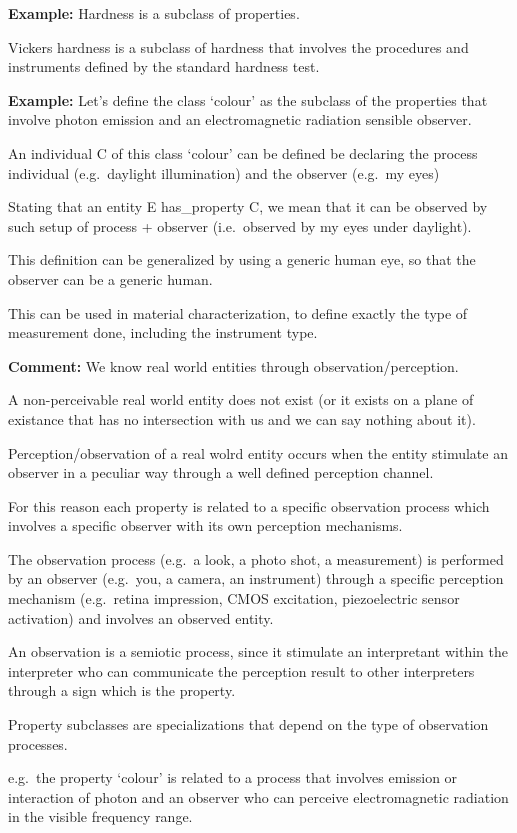 \documentclass[a4paper,]{report}
\begin{document}
\textbf{Example:} Hardness is a subclass of properties.

Vickers hardness is a subclass of hardness that involves the procedures
and instruments defined by the standard hardness test.

\textbf{Example:} Let's define the class `colour' as the subclass of the
properties that involve photon emission and an electromagnetic radiation
sensible observer.

An individual C of this class `colour' can be defined be declaring the
process individual (e.g.~daylight illumination) and the observer
(e.g.~my eyes)

Stating that an entity E has\_property C, we mean that it can be
observed by such setup of process + observer (i.e.~observed by my eyes
under daylight).

This definition can be generalized by using a generic human eye, so that
the observer can be a generic human.

This can be used in material characterization, to define exactly the
type of measurement done, including the instrument type.

\textbf{Comment:} We know real world entities through
observation/perception.

A non-perceivable real world entity does not exist (or it exists on a
plane of existance that has no intersection with us and we can say
nothing about it).

Perception/observation of a real wolrd entity occurs when the entity
stimulate an observer in a peculiar way through a well defined
perception channel.

For this reason each property is related to a specific observation
process which involves a specific observer with its own perception
mechanisms.

The observation process (e.g.~a look, a photo shot, a measurement) is
performed by an observer (e.g.~you, a camera, an instrument) through a
specific perception mechanism (e.g.~retina impression, CMOS excitation,
piezoelectric sensor activation) and involves an observed entity.

An observation is a semiotic process, since it stimulate an interpretant
within the interpreter who can communicate the perception result to
other interpreters through a sign which is the property.

Property subclasses are specializations that depend on the type of
observation processes.

e.g.~the property `colour' is related to a process that involves
emission or interaction of photon and an observer who can perceive
electromagnetic radiation in the visible frequency range.
\end{document}
